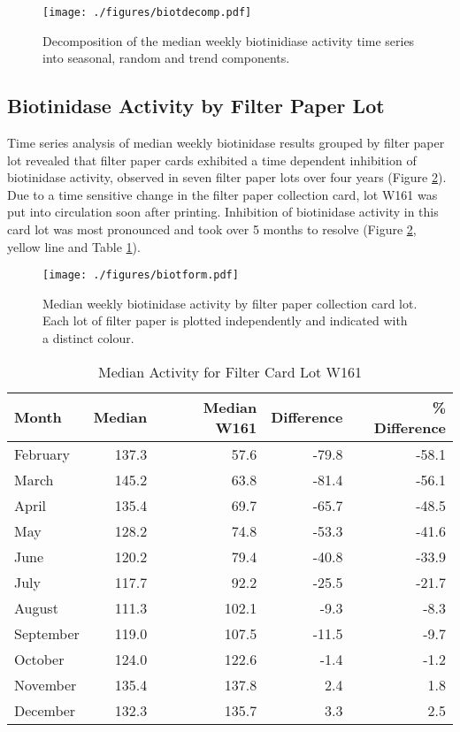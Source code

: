 \documentclass[review]{elsarticle}
\begin{document}
\begin{figure}[htbp]
\centering
\texttt{[image: ./figures/biotdecomp.pdf]}
\caption{\label{fig:org584deb6}Decomposition of the median weekly biotinidiase activity time series into seasonal, random and trend components.}
\end{figure}

\clearpage

\subsection*{Biotinidase Activity by Filter Paper Lot}
\label{sec:orga32af7a}
Time series analysis of median weekly biotinidase results grouped by
filter paper lot revealed that filter paper cards exhibited a time
dependent inhibition of biotinidase activity, observed in seven filter
paper lots over four years (Figure \ref{fig:org99e6407}). Due to a time sensitive
change in the filter paper collection card, lot W161 was put into
circulation soon after printing. Inhibition of biotinidase activity in
this card lot was most pronounced and took over 5 months to resolve
(Figure \ref{fig:org99e6407}, yellow line and Table \ref{tab:w161_months}).

\begin{figure}[htbp]
\centering
\texttt{[image: ./figures/biotform.pdf]}
\caption{\label{fig:org99e6407}Median weekly biotinidase activity by filter paper collection card lot. Each lot of filter paper is plotted independently and indicated with a distinct colour.}
\end{figure}

\clearpage

\begin{table}[ht]
\centering
\begin{tabular}{lrrrr}
  \hline
Month & Median & Median W161 & Difference & \% Difference \\ 
  \hline
February & 137.3 & 57.6 & -79.8 & -58.1 \\ 
  March & 145.2 & 63.8 & -81.4 & -56.1 \\ 
  April & 135.4 & 69.7 & -65.7 & -48.5 \\ 
  May & 128.2 & 74.8 & -53.3 & -41.6 \\ 
  June & 120.2 & 79.4 & -40.8 & -33.9 \\ 
  July & 117.7 & 92.2 & -25.5 & -21.7 \\ 
  August & 111.3 & 102.1 & -9.3 & -8.3 \\ 
  September & 119.0 & 107.5 & -11.5 & -9.7 \\ 
  October & 124.0 & 122.6 & -1.4 & -1.2 \\ 
  November & 135.4 & 137.8 & 2.4 & 1.8 \\ 
  December & 132.3 & 135.7 & 3.3 & 2.5 \\ 
   \hline
\end{tabular}
\caption{Median Activity for Filter Card Lot W161} 
\label{tab:w161_months}
\end{table}
\end{document}
